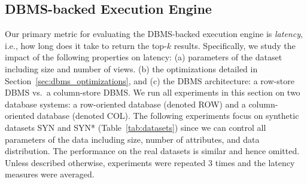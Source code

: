 \subsection{DBMS-backed Execution Engine}
\label{sec:expts_dbms_execution_engine}

Our primary metric for evaluating the DBMS-backed
execution engine is {\em latency},
i.e., how long does it take \SeeDB to return the top-$k$ results.
Specifically, we study the impact of the following properties on latency:
(a) parameters of the dataset including size and number of views.
(b) the optimizations detailed in Section~\ref{sec:dbms_optimizations}, and
(c) the DBMS architecture: a row-store DBMS vs.~a column-store DBMS.
We run all experiments in this section on two database systems: a
row-oriented database (denoted ROW) and a
column-oriented database (denoted COL).
The following experiments focus on synthetic datasets SYN and SYN* 
(Table~\ref{tab:datasets}) since we can control all parameters of the 
data including size, number of 
attributes, and data distribution.
The performance on the real datasets is similar and hence omitted.
Unless described otherwise, experiments were repeated 3 times and the latency measures 
were averaged.

